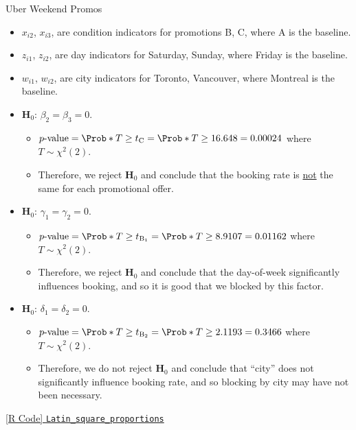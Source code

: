 \begin{Example}{Uber Weekend Promos}{}
    \begin{itemize}
        \item $ x_{i2} $, $ x_{i3} $, are condition indicators for promotions B, C, where A is the baseline.
        \item $ z_{i1} $, $ z_{i2} $, are day indicators for Saturday, Sunday, where Friday is the baseline.
        \item $ w_{i1} $, $ w_{i2} $, are city indicators for Toronto, Vancouver, where Montreal is the baseline.
    \end{itemize}
    \begin{itemize}
        \item $ \mathbf{H}_0 $: $ \beta_2=\beta_3=0 $.
              \begin{itemize}
                  \item $ p\text{-value}=\Prob*{T\ge t_\text{C}}=\Prob*{T\ge 16.648}=0.00024 $ where $ T \sim \chi^2(2) $.
                  \item Therefore, we reject $ \mathbf{H}_0 $ and conclude that the booking rate is \underline{not} the same
                        for each promotional offer.
              \end{itemize}
        \item $ \mathbf{H}_0 $: $ \gamma_1=\gamma_2=0 $.
              \begin{itemize}
                  \item $ p\text{-value}=\Prob*{T\ge t_{\text{B}_1}}=\Prob*{T\ge 8.9107}=0.01162 $ where $ T \sim \chi^2(2) $.
                  \item Therefore, we reject $ \mathbf{H}_0 $ and conclude that the day-of-week significantly influences booking, and so it is good that we blocked by this factor.
              \end{itemize}
        \item $ \mathbf{H}_0 $: $ \delta_1=\delta_2=0 $.
              \begin{itemize}
                  \item $ p\text{-value}=\Prob*{T\ge t_{\text{B}_2}}=\Prob*{T\ge 2.1193}=0.3466 $ where $ T \sim \chi^2(2) $.
                  \item Therefore, we do not reject $ \mathbf{H}_0 $ and conclude that ``city'' does not significantly influence booking rate, and so blocking by city may have not been necessary.
              \end{itemize}
    \end{itemize}
    \href{https://github.com/Hextical/university-notes/blob/master/year-3/semester-3/STAT 430/code/W6/Latin_square_proportions.R}{[R Code] \texttt{Latin\_square\_proportions}}
\end{Example}
